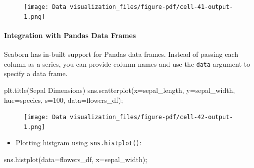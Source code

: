 \documentclass[
  letterpaper,
  DIV=11,
  numbers=noendperiod]{scrreprt}
\let\oldparagraph\paragraph
\renewcommand{\paragraph}[1]{\oldparagraph{#1}\mbox{}}
\newenvironment{Shaded}{\begin{snugshade}}{\end{snugshade}}
\newcommand{\DecValTok}[1]{\textcolor[rgb]{0.68,0.00,0.00}{#1}}
\newcommand{\NormalTok}[1]{\textcolor[rgb]{0.00,0.23,0.31}{#1}}
\newcommand{\OperatorTok}[1]{\textcolor[rgb]{0.37,0.37,0.37}{#1}}
\newcommand{\StringTok}[1]{\textcolor[rgb]{0.13,0.47,0.30}{#1}}
\providecommand{\tightlist}{%
  \setlength{\itemsep}{0pt}\setlength{\parskip}{0pt}}\usepackage{longtable,booktabs,array}
\begin{document}
\begin{figure}[H]

{\centering \texttt{[image: Data visualization\_files/figure-pdf/cell-41-output-1.png]}

}

\end{figure}

\hypertarget{integration-with-pandas-data-frames}{%
\paragraph{Integration with Pandas Data
Frames}\label{integration-with-pandas-data-frames}}

Seaborn has in-built support for Pandas data frames. Instead of passing
each column as a series, you can provide column names and use the
\texttt{data} argument to specify a data frame.

\begin{Shaded}
\begin{Highlighting}[]
\NormalTok{plt.title(}\StringTok{\textquotesingle{}Sepal Dimensions\textquotesingle{}}\NormalTok{)}
\NormalTok{sns.scatterplot(x}\OperatorTok{=}\StringTok{\textquotesingle{}sepal\_length\textquotesingle{}}\NormalTok{, }
\NormalTok{                y}\OperatorTok{=}\StringTok{\textquotesingle{}sepal\_width\textquotesingle{}}\NormalTok{, }
\NormalTok{                hue}\OperatorTok{=}\StringTok{\textquotesingle{}species\textquotesingle{}}\NormalTok{,}
\NormalTok{                s}\OperatorTok{=}\DecValTok{100}\NormalTok{,}
\NormalTok{                data}\OperatorTok{=}\NormalTok{flowers\_df)}\OperatorTok{;}
\end{Highlighting}
\end{Shaded}

\begin{figure}[H]

{\centering \texttt{[image: Data visualization\_files/figure-pdf/cell-42-output-1.png]}

}

\end{figure}

\begin{itemize}
\tightlist
\item
  Plotting histgram using \texttt{sns.histplot()}:
\end{itemize}

\begin{Shaded}
\begin{Highlighting}[]
\NormalTok{sns.histplot(data}\OperatorTok{=}\NormalTok{flowers\_df, x}\OperatorTok{=}\StringTok{\textquotesingle{}sepal\_width\textquotesingle{}}\NormalTok{)}\OperatorTok{;}
\end{Highlighting}
\end{Shaded}
\end{document}
